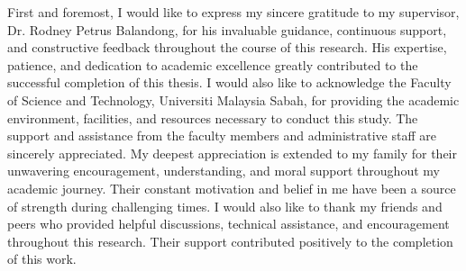 First and foremost, I would like to express my sincere gratitude to my supervisor, Dr. Rodney Petrus Balandong, for his invaluable guidance, continuous support, and constructive feedback throughout the course of this research. His expertise,  patience, and dedication to academic excellence greatly contributed to the successful completion of this thesis.
I would also like to acknowledge the Faculty of Science and Technology, Universiti Malaysia Sabah, for providing the academic environment, facilities, and resources necessary to conduct this study. The support and assistance from the faculty members and administrative staff are sincerely appreciated.
My deepest appreciation is extended to my family for their unwavering encouragement, understanding, and moral support throughout my academic journey. Their constant motivation and belief in me have been a source of strength during challenging times.
I would also like to thank my friends and peers who provided helpful discussions, technical assistance, and encouragement throughout this research. Their support contributed positively to the completion of this work.